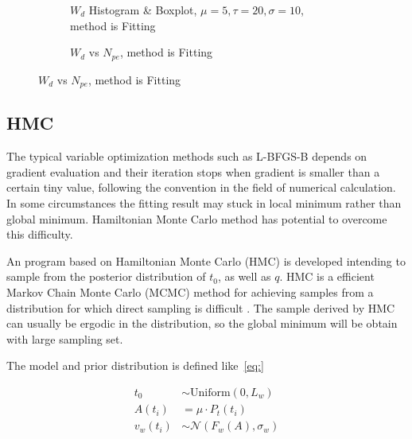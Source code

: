 \begin{figure}[H]
\begin{minipage}[t]{.5\textwidth}
\begin{figure}[H]
    \centering
    \resizebox{\textwidth}{!}{}
    \caption{\label{fig:fitting-hist} $W_{d}$ Histogram \& Boxplot, $\mu=5, \tau=20, \sigma=10$, method is Fitting}
\end{figure}
\end{minipage}
\begin{minipage}[t]{.5\textwidth}
\begin{figure}[H]
    \centering
    \resizebox{\textwidth}{!}{}
    \caption{\label{fig:fitting-npe} $W_{d}$ vs $N_{pe}$, method is Fitting}
\end{figure}
\end{minipage}
\end{figure}

\subsection{HMC}

The typical variable optimization methods such as L-BFGS-B depends on gradient evaluation and their iteration stops when gradient is smaller than a certain tiny value, following the convention in the field of numerical calculation. In some circumstances the fitting result may stuck in local minimum rather than global minimum. Hamiltonian Monte Carlo method has potential to overcome this difficulty. 

An program based on Hamiltonian Monte Carlo (HMC) is developed intending to sample from the posterior distribution of $t_{0}$, as well as $q$. HMC is a efficient Markov Chain Monte Carlo (MCMC) method for achieving samples from a distribution for which direct sampling is difficult \cite{neal_mcmc_2012}. The sample derived by HMC can usually be ergodic in the distribution, so the global minimum will be obtain with large sampling set. 

The model and prior distribution is defined like~\eqref{eq:}

\begin{align}
    t_{0} &\sim \mathrm{Uniform}(0, L_{w}) \\
    A(t_{i}) &= \mu \cdot P_{t}(t_{i}) \\
    v_{w}(t_{i}) &\sim \mathcal{N}(F_{w}(A), \sigma_{w})
\end{align}

